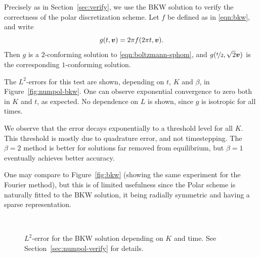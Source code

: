 Precisely as in Section~\vref{sec:verify}, we use the BKW solution to verify the correctness of the polar
discretization scheme. Let $f$ be defined as in \eqref{eqn:bkw}, and write
\begin{equation} \label{eqn:pol-bkw}
    g(t,{\bm v}) = 2\pi f(2\pi t, {\bm v}).
\end{equation}
Then $g$ is a $2$-conforming solution to \eqref{eqn:boltzmann-sphom}, and $g(\nicefrac{t}{2},\sqrt{2}{\bm v})$ is
the corresponding $1$-conforming solution.

The $L^2$-errors for this test are shown, depending on $t$, $K$ and $\beta$, in Figure~\vref{fig:numpol-bkw}.
One can observe exponential convergence to zero both in $K$ and $t$, as expected. No dependence on $L$ is
shown, since $g$ is isotropic for all times.

We observe that the error decays exponentially to a threshold level for all $K$. This threshold is mostly due
to quadrature error, and not timestepping. The $\beta=2$ method is better for solutions far removed from
equilibrium, but $\beta=1$ eventually achieves better accuracy.

One may compare to Figure~\vref{fig:bkw} (showing the same experiment for the Fourier method), but this is of
limited usefulness since the Polar scheme is naturally fitted to the BKW solution, it being radially symmetric
and having a sparse representation.

\begin{figure}
\centering
{} \\
\caption{$L^2$-error for the BKW solution depending on $K$ and time. See Section~\vref{sec:numpol-verify} for
details.}
\label{fig:numpol-bkw}
\end{figure}

